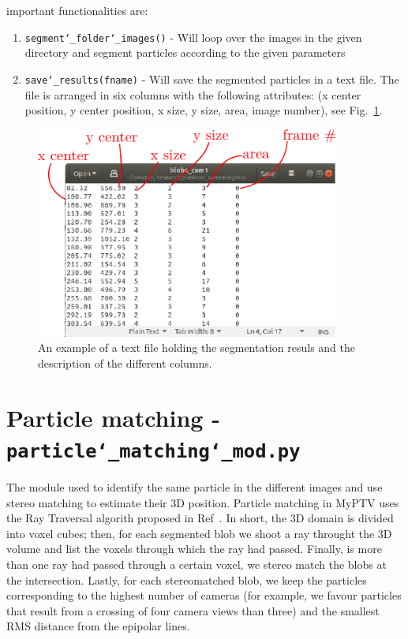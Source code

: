 \documentclass[10pt,a4paper]{article}
\begin{document}
important functionalities are:
%
\begin{enumerate}
	\item \texttt{segment\char`_folder\char`_images()} - Will loop over the images in the given directory and segment particles according to the given parameters
	\item \texttt{save\char`_results(fname)} - Will save the segmented particles in a text file. The file is arranged in six columns with the following attributes: (x center position, y center position, x size, y size, area, image number), see Fig.~\ref{fig:blobfile}.
\end{enumerate}

\begin{figure}[h!]
	\centering
	\includegraphics[width=10cm]{blob_file.pdf}
	\caption{An example of a text file holding the segmentation resuls and the description of the different columns. \label{fig:blobfile}} 
\end{figure}








\section{Particle matching - \texttt{particle\char`_matching\char`_mod.py}} \label{sec:matching}

The module used to identify the same particle in the different images and use stereo matching to estimate their 3D position. Particle matching in MyPTV uses the Ray Traversal algorith proposed in Ref~\cite{Bourgoin2020}. In short, the 3D domain is divided into voxel cubes; then, for each segmented blob we shoot a ray throught the 3D volume and list the voxels through which the ray had passed. Finally, is more than one ray had passed through a certain voxel, we stereo match the blobs at the intersection. Lastly, for each stereomatched blob, we keep the particles corresponding to the highest number of cameras (for example, we favour particles that result from a crossing of four camera views than three) and the smallest RMS distance from the epipolar lines.  
\end{document}
